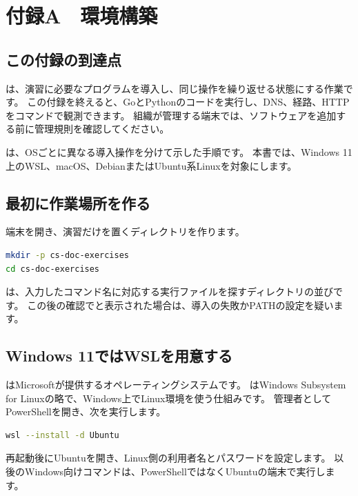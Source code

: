 \chapter{付録A　環境構築}\setcounter{table}{0}

\section{この付録の到達点}

は、演習に必要なプログラムを導入し、同じ操作を繰り返せる状態にする作業です。
この付録を終えると、GoとPythonのコードを実行し、DNS、経路、HTTPをコマンドで観測できます。
組織が管理する端末では、ソフトウェアを追加する前に管理規則を確認してください。

は、OSごとに異なる導入操作を分けて示した手順です。
本書では、Windows 11上のWSL、macOS、DebianまたはUbuntu系Linuxを対象にします。

\section{最初に作業場所を作る}

端末を開き、演習だけを置くディレクトリを作ります。

\begin{lstlisting}[language=bash]
mkdir -p cs-doc-exercises
cd cs-doc-exercises
\end{lstlisting}

は、入力したコマンド名に対応する実行ファイルを探すディレクトリの並びです。
この後の確認でと表示された場合は、導入の失敗かPATHの設定を疑います。

\section{Windows 11ではWSLを用意する}

はMicrosoftが提供するオペレーティングシステムです。
はWindows Subsystem for Linuxの略で、Windows上でLinux環境を使う仕組みです。
管理者としてPowerShellを開き、次を実行します。

\begin{lstlisting}[language=bash]
wsl --install -d Ubuntu
\end{lstlisting}

再起動後にUbuntuを開き、Linux側の利用者名とパスワードを設定します。
以後のWindows向けコマンドは、PowerShellではなくUbuntuの端末で実行します。

